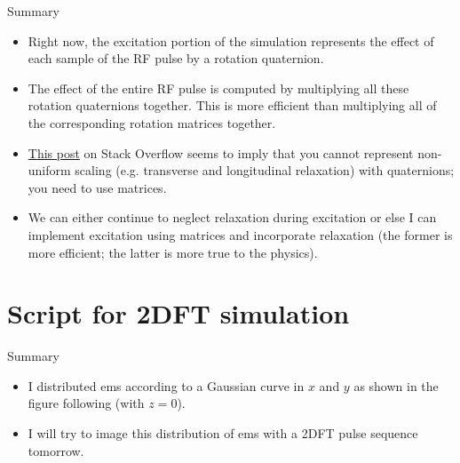 \documentclass[dvipsnames]{beamer}
\begin{document}
\begin{frame}{Summary}
\begin{itemize}
\item Right now, the excitation portion of the simulation represents the effect of each sample of the RF pulse by a rotation quaternion.
\item The effect of the entire RF pulse is computed by multiplying all these rotation quaternions together. This is more efficient than multiplying all of the corresponding rotation matrices together.
\item \href{https://computergraphics.stackexchange.com/questions/138/when-should-quaternions-be-used-to-represent-rotation-and-scaling-in-3d}{This post} on Stack Overflow seems to imply that you cannot represent non-uniform scaling (e.g. transverse and longitudinal relaxation) with quaternions; you need to use matrices.
\item We can either continue to neglect relaxation during excitation or else I can implement excitation using matrices and incorporate relaxation (the former is more efficient; the latter is more true to the physics).
\end{itemize}
\end{frame}

\section{Script for 2DFT simulation}

\begin{frame}{Summary}
\begin{itemize}
\item I distributed ems according to a Gaussian curve in $x$ and $y$ as shown in the figure following (with $z = 0$).
\item I will try to image this distribution of ems with a 2DFT pulse sequence tomorrow.
\end{itemize}
\end{frame}

\begin{frame}
\begin{center}
\texttt{[image: \{density]}}
\end{center}
\end{frame}
\end{document}
